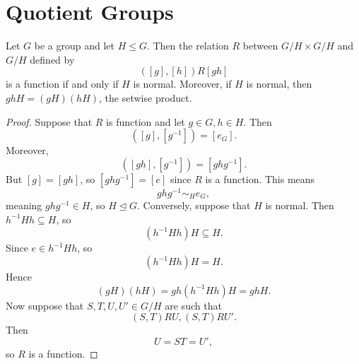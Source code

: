 \documentclass[pmath347]{subfiles}
\begin{document}

    \section{Quotient Groups}

    \begin{prop}{}
        Let $G$ be a group and let $H\leq G$. Then the relation $R$ between $G /H\times G /H$ and $G /H$ defined by
        \begin{equation*}
            \left( \left[ g \right] , \left[ h \right]  \right) R \left[ gh \right] 
        \end{equation*}
        is a function if and only if $H$ is normal. Moreover, if $H$ is normal, then $ghH=\left( gH \right) \left( hH \right)$, the setwise product.
    \end{prop}

    \begin{proof}
        Suppose that $R$ is function and let $g\in G, h\in H$. Then
        \begin{equation*}
            \left( \left[ g \right] , \left[ g^{-1}  \right]  \right) = \left[ e_G \right] .
        \end{equation*}
        Moreover,
        \begin{equation*}
            \left( \left[ gh \right] , \left[ g^{-1}  \right]  \right) = \left[ ghg^{-1}  \right] .
        \end{equation*}
        But $\left[ g \right] = \left[ gh \right]$, so $\left[ ghg^{-1}  \right] = \left[ e \right] $ since $R$ is a function. This means
        \begin{equation*}
            ghg^{-1} \sim_H e_G,
        \end{equation*}
        meaning $ghg^{-1} \in H$, so $H\trianglelefteq G$. Conversely, suppose that $H$ is normal. Then $h^{-1} Hh\subseteq H$, so
        \begin{equation*}
            \left( h^{-1} Hh \right) H \subseteq H.
        \end{equation*}
        Since $e\in h^{-1} Hh$, so 
        \begin{equation*}
            \left( h^{-1} Hh \right) H = H.
        \end{equation*}
        Hence
        \begin{equation*}
            \left( gH \right) \left( hH \right) = gh\left( h^{-1} Hh \right) H = ghH.
        \end{equation*}
        Now suppose that $S,T,U,U'\in G /H$ are such that
        \begin{equation*}
            \left( S,T \right) RU, \left( S,T \right) RU'.
        \end{equation*}
        Then
        \begin{equation*}
            U = ST = U',
        \end{equation*}
        so $R$ is a function.
    \end{proof}
\end{document}
